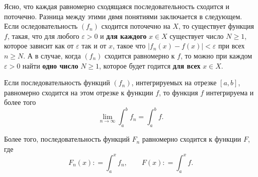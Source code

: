 \begin{remark}
    Ясно, что каждая равномерно сходящаяся последовательность сходится и поточечно. Разница между этими двмя понятиями заключается в следующем. Если оследовательность $(f_n)$ сходится поточечно на $X$, то существует функция $f$, такая, что для любого $\varepsilon>0$ и \textbf{для каждого} $x \in X$ существует число $N\ge 1$, которое зависит как от $\varepsilon$ так и от $x$, такое что $|f_n(x) -f(x)| <\varepsilon$ при всех $n \ge N$. А в случае, когда $(f_n)$ сходится равномерно к $f$, то можно при каждом $\varepsilon>0$ найти \textbf{одно число} $N\ge 1$, которое будет годится \textbf{для всех} $x \in X$.
\end{remark}

\begin{theorem}
    Если последовательность функций $(f_n)$, интегрируемых на отрезке $[a,b]$, равномерно сходится на этом отрезке к функции $f$, то функция $f$ интегрируема и более того
    \[
     \lim_{n\to \infty}\int_a^b f_n = \int_a^b f. 
    \]

    Более того, последовательность функций $F_n$ равномерно сходится к функции $F$, где
    \[
     F_n(x) : = \int_a^x f_n, \qquad F(x) : = \int_a^x f.
    \]
\end{theorem}


